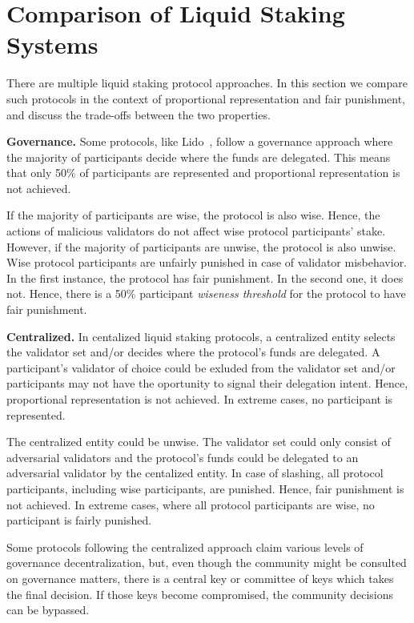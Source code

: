 \section{Comparison of Liquid Staking Systems}

There are multiple liquid staking protocol approaches. In this section we
compare such protocols in the context of proportional representation
and fair punishment, and discuss the trade-offs between the
two properties.

\textbf{Governance.}
Some protocols, like Lido~\cite{lido}, follow a governance approach
where the majority of participants decide where the funds are
delegated. This means that only 50\% of participants are
represented and proportional representation is not achieved.

If the majority of participants are
wise, the protocol is also wise. Hence, the actions of malicious validators
do not affect wise protocol participants' stake.
However, if the majority of participants are unwise, the protocol is
also unwise. Wise protocol participants are unfairly punished in case
of validator misbehavior.
In the first instance, the protocol has fair punishment. In the
second one, it does not. Hence, there is a 50\% participant
\emph{wiseness threshold} for the protocol to have fair punishment.

\textbf{Centralized.}
In centalized liquid staking protocols, a centralized entity
selects the validator set and/or decides where the protocol's funds
are delegated. A participant's validator of choice could be exluded from
the validator set and/or participants may not have the oportunity to signal
their delegation intent. Hence, proportional representation is not
achieved. In extreme cases, no participant is represented.

The centralized entity could be unwise. The validator set could only
consist of adversarial validators and the protocol's funds could be delegated
to an adversarial validator by the centalized entity. In case of slashing,
all protocol participants, including wise participants, are punished.
Hence, fair punishment is not achieved. In extreme cases, where all
protocol participants are wise, no participant is fairly punished.

Some protocols following the centralized approach claim various levels of
governance decentralization, but, even though the community might be consulted
on governance matters, there is a central key or committee of keys which takes
the final decision. If those keys become compromised, the community decisions
can be bypassed.

